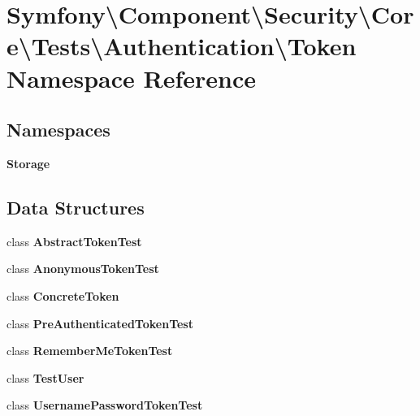 \section{Symfony\textbackslash{}Component\textbackslash{}Security\textbackslash{}Core\textbackslash{}Tests\textbackslash{}Authentication\textbackslash{}Token Namespace Reference}
\label{namespace_symfony_1_1_component_1_1_security_1_1_core_1_1_tests_1_1_authentication_1_1_token}
\subsection*{Namespaces}
\begin{DoxyCompactItemize}
\item 
 {\bf Storage}
\end{DoxyCompactItemize}
\subsection*{Data Structures}
\begin{DoxyCompactItemize}
\item 
class {\bf Abstract\+Token\+Test}
\item 
class {\bf Anonymous\+Token\+Test}
\item 
class {\bf Concrete\+Token}
\item 
class {\bf Pre\+Authenticated\+Token\+Test}
\item 
class {\bf Remember\+Me\+Token\+Test}
\item 
class {\bf Test\+User}
\item 
class {\bf Username\+Password\+Token\+Test}
\end{DoxyCompactItemize}

